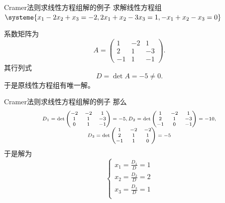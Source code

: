 \begin{frame}

\begin{block}{Cramer法则求线性方程组解的例子}
求解线性方程组
$\systeme{x_1 - 2x_2 + x_3 = -2 , 2x_1 + x_2 - 3x_3 = 1 , -x_1 + x_2 - x_3 = 0}$

\vspace{1em}
\pause

系数矩阵为
\[A = \begin{pmatrix} 1 & -2 & 1 \\ 2 & 1 & -3 \\ -1 & 1 & -1 \end{pmatrix}.\]
其行列式
\[D = \det A = -5 \neq 0.\]
于是原线性方程组有唯一解。
\end{block}

\end{frame}


\begin{frame}

\begin{block}{Cramer法则求线性方程组解的例子}
那么
\[
\scriptsize
\begin{array}{c}
D_1 = \det\begin{pmatrix} -2 & -2 & 1 \\ 1 & 1 & -3 \\ 0 & 1 & -1 \end{pmatrix} = -5, D_2 = \det \begin{pmatrix} 1 & -2 & 1 \\ 2 & 1 & -3 \\ -1 & 0 & -1 \end{pmatrix} = -10, \\
D_3 = \det \begin{pmatrix} 1 & -2 & -2 \\ 2 & 1 & 1 \\ -1 & 1 & 0 \end{pmatrix} = -5
\end{array}
\]
于是解为
\[
\begin{cases}
x_1 = \frac{D_1}{D} = 1 \\
x_2 = \frac{D_2}{D} = 2 \\
x_3 = \frac{D_3}{D} = 1 \\
\end{cases}
\]
\end{block}

\end{frame}

